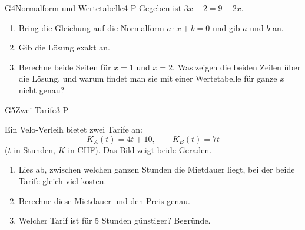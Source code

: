 \documentclass[11pt]{article}
\begin{document}
\begin{lpaufgabe}{G4}{Normalform und Wertetabelle}{4 P}
Gegeben ist $3x + 2 = 9 - 2x$.
\begin{enumerate}[label=(\alph*),leftmargin=*,itemsep=1pt]
\item Bring die Gleichung auf die Normalform $a \cdot x + b = 0$ und gib $a$ und $b$ an.
\item Gib die Lösung exakt an.
\item Berechne beide Seiten für $x = 1$ und $x = 2$. Was zeigen die beiden Zeilen über die Lösung, und warum findet man sie mit einer Wertetabelle für ganze $x$ nicht genau?
\end{enumerate}
\end{lpaufgabe}

\begin{lpaufgabe}{G5}{Zwei Tarife}{3 P}
\begin{minipage}[t]{0.52\linewidth}\vspace{0pt}
Ein Velo-Verleih bietet zwei Tarife an:
\[ K_A(t) = 4t + 10, \qquad K_B(t) = 7t \]
($t$ in Stunden, $K$ in CHF). Das Bild zeigt beide Geraden.
\begin{enumerate}[label=(\alph*),leftmargin=*,itemsep=1pt]
\item Lies ab, zwischen welchen ganzen Stunden die Mietdauer liegt, bei der beide Tarife gleich viel kosten.
\item Berechne diese Mietdauer und den Preis genau.
\item Welcher Tarif ist für 5 Stunden günstiger? Begründe.
\end{enumerate}
\end{minipage}\hfill
\begin{minipage}[t]{0.44\linewidth}\vspace{0pt}\centering
{}
\end{minipage}
\end{lpaufgabe}
\end{document}
